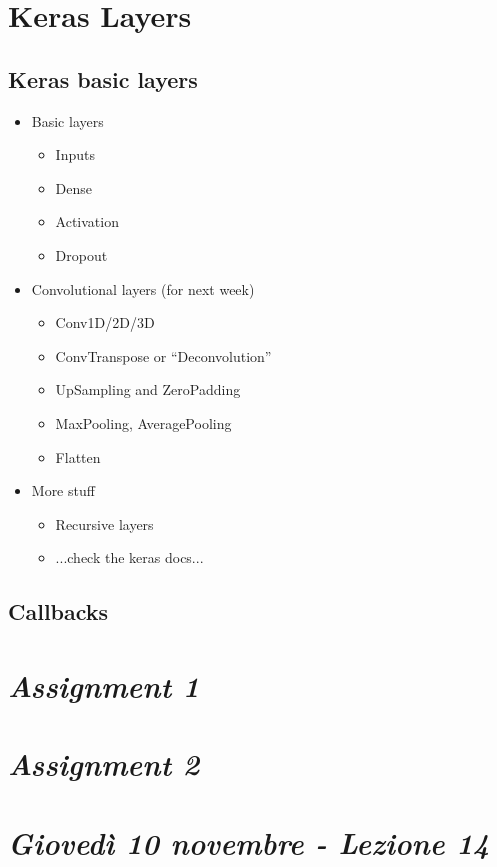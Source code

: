 \section{Keras Layers}
\subsection{Keras basic layers}

\begin{itemize}
	\item Basic layers
\begin{itemize}
	\item Inputs
	\item Dense
	\item Activation
	\item Dropout
\end{itemize}
	\item Convolutional layers (for next week)
\begin{itemize}
	\item Conv1D/2D/3D
	\item ConvTranspose or “Deconvolution”
	\item UpSampling and ZeroPadding
	\item MaxPooling, AveragePooling
	\item Flatten
\end{itemize}
	\item More stuff
\begin{itemize}
	\item Recursive layers
	\item ...check the keras docs...
\end{itemize}
\end{itemize}

\subsection{Callbacks}

\section{\textit{Assignment 1}}


\section{\textit{Assignment 2}}

\section{\textit{Giovedì 10 novembre - Lezione 14}}

